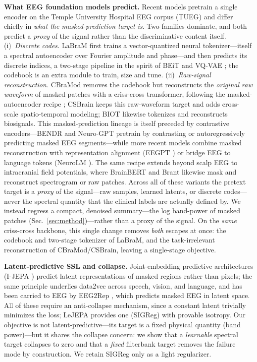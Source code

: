 \documentclass[letterpaper]{article} %
\begin{document}
\noindent\textbf{What EEG foundation models predict.} Recent models pretrain a
single encoder on the Temple University Hospital EEG corpus (TUEG)
\cite{obeid2016tuh} and differ chiefly in \emph{what the masked-prediction target
is}. Two families dominate, and both predict a \emph{proxy} of the signal rather
than the discriminative content itself. (i)~\emph{Discrete codes.} LaBraM
\cite{jiang2024labram} first trains a vector-quantized neural tokenizer---itself a
spectral autoencoder over Fourier amplitude and phase---and then predicts its
discrete indices, a two-stage pipeline in the spirit of BEiT \cite{bao2022beit} and
VQ-VAE \cite{oord2017vqvae}; the codebook is an extra module to train, size and
tune. (ii)~\emph{Raw-signal reconstruction.} CBraMod \cite{wang2025cbramod} removes
the codebook but reconstructs the \emph{original raw waveform} of masked patches
with a criss-cross transformer, following the masked-autoencoder recipe
\cite{he2022mae}; CSBrain \cite{csbrain} keeps this raw-waveform target and adds
cross-scale spatio-temporal modeling; BIOT \cite{yang2023biot} likewise tokenizes
and reconstructs biosignals. This masked-prediction lineage is itself preceded by
contrastive encoders---BENDR \cite{kostas2021bendr} and Neuro-GPT
\cite{cui2024neurogpt} pretrain by contrasting or autoregressively predicting
masked EEG segments---while more recent models combine masked reconstruction with
representation alignment (EEGPT \cite{wang2024eegpt}) or bridge EEG to language
tokens (NeuroLM \cite{jiang2025neurolm}). The same recipe extends beyond scalp EEG
to intracranial field potentials, where BrainBERT \cite{wang2023brainbert} and Brant
\cite{zhang2023brant} likewise mask and reconstruct spectrogram or raw patches.
Across all of these variants the pretext
target is a \emph{proxy} of the signal---raw samples, learned latents, or discrete
codes---never the spectral quantity that the clinical labels are actually defined
by. We instead regress a compact, denoised summary---the
log band-power of masked patches (Sec.~\ref{sec:method})---rather than a proxy of
the signal. On the \emph{same} criss-cross backbone, this single change removes
\emph{both} escapes at once: the codebook and two-stage tokenizer of LaBraM, and the
task-irrelevant reconstruction of CBraMod/CSBrain, leaving a single-stage objective.

\noindent\textbf{Latent-predictive SSL and collapse.} Joint-embedding predictive
architectures (I-JEPA \cite{assran2023ijepa}) predict latent representations of
masked regions rather than pixels; the same principle underlies data2vec
\cite{baevski2022data2vec} across speech, vision, and language, and has been carried
to EEG by EEG2Rep \cite{foumani2024eeg2rep}, which predicts masked EEG in latent
space. All of these require an anti-collapse mechanism, since a constant latent
trivially minimizes the loss; LeJEPA \cite{balestriero2025lejepa} provides one
(SIGReg) with provable isotropy. Our
objective is not latent-predictive---its target is a fixed physical quantity
(band power)---but it shares the collapse concern: we show that a \emph{learnable}
spectral target collapses to zero and that a \emph{fixed} filterbank target removes
the failure mode by construction. We retain SIGReg only as a light regularizer.
\end{document}
